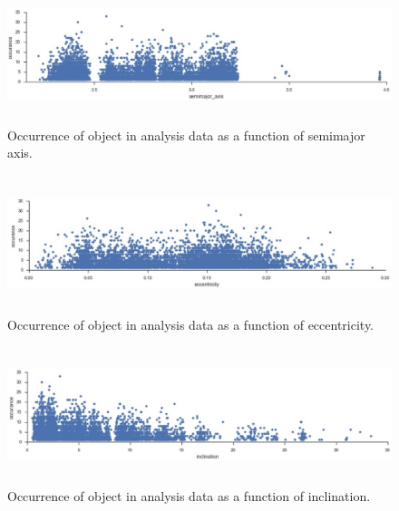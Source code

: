 \documentclass[iop,apj]{emulateapj}
\begin{document}
\begin{figure}[!htb]
    \centering
    \includegraphics[height=4cm]{graphs/occur_a.png}
    \caption{Occurrence of object in analysis data as a function of semimajor axis. }\label{fig:3}
\end{figure}

\begin{figure}[!htb]
    \centering
    \includegraphics[height=4cm]{graphs/occur_e.png}
    \caption{Occurrence of object in analysis data as a function of eccentricity. }\label{fig:4}
\end{figure}

\begin{figure}[!htb]
    \centering
    \includegraphics[height=4cm]{graphs/occur_i.png}
    \caption{Occurrence of object in analysis data as a function of inclination. }\label{fig:5}
\end{figure}
\end{document}
